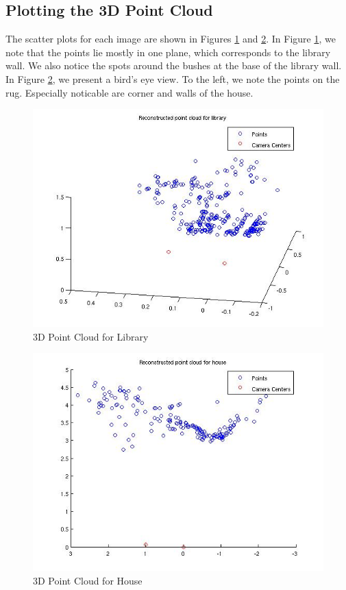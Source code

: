 \documentclass[11pt]{article}
\begin{document}
\subsection{Plotting the 3D Point Cloud}
The scatter plots for each image are shown in Figures \ref{3d_lib} and
\ref{3d_house}. In Figure \ref{3d_lib}, we note that the points lie mostly
in one plane, which corresponds to the library wall. We also notice the spots
around the bushes at the base of the library wall. In Figure \ref{3d_house},
we present a bird's eye view. To the left, we note the points on the rug.
Especially noticable are corner and walls of the house.

\begin{figure}[h!]
  \caption{3D Point Cloud for Library}
  \label{3d_lib}
  \centering
    \includegraphics[width=0.6\linewidth]{../img/library_camera.jpg}
\end{figure}

\begin{figure}[h!]
  \caption{3D Point Cloud for House}
  \label{3d_house}
  \centering
    \includegraphics[width=0.6\linewidth]{../img/house_camera.jpg}
\end{figure}
\end{document}
